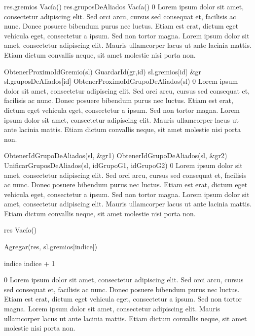 {
	\state res.gremios \asig Vacía()					
	\state res.gruposDeAliados \asig Vacía()			
}
{0}
{Lorem ipsum dolor sit amet, consectetur adipiscing elit. Sed orci arcu, cursus sed consequat et, facilisis ac nunc. Donec posuere bibendum purus nec luctus. Etiam est erat, dictum eget vehicula eget, consectetur a ipsum. Sed non tortor magna. Lorem ipsum dolor sit amet, consectetur adipiscing elit. Mauris ullamcorper lacus ut ante lacinia mattis. Etiam dictum convallis neque, sit amet molestie nisi porta non.}

{
	\state {} \asig ObtenerProximoIdGremio(sl)			
	\state
	\state GuardarId(gr,id)												
	\state sl.gremios[id] \asig \&gr									
	\state sl.gruposDeAliados[id] \asig ObtenerProximoIdGrupoDeAliados(sl)			
}
{0}
{Lorem ipsum dolor sit amet, consectetur adipiscing elit. Sed orci arcu, cursus sed consequat et, facilisis ac nunc. Donec posuere bibendum purus nec luctus. Etiam est erat, dictum eget vehicula eget, consectetur a ipsum. Sed non tortor magna. Lorem ipsum dolor sit amet, consectetur adipiscing elit. Mauris ullamcorper lacus ut ante lacinia mattis. Etiam dictum convallis neque, sit amet molestie nisi porta non.}

{
	\state {} \asig ObtenerIdGrupoDeAliados(sl, \&gr1)			
	\state {} \asig ObtenerIdGrupoDeAliados(sl, \&gr2)			
	\state 
	\state UnificarGruposDeAliados(sl, idGrupoG1, idGrupoG2)							
}
{0}
{Lorem ipsum dolor sit amet, consectetur adipiscing elit. Sed orci arcu, cursus sed consequat et, facilisis ac nunc. Donec posuere bibendum purus nec luctus. Etiam est erat, dictum eget vehicula eget, consectetur a ipsum. Sed non tortor magna. Lorem ipsum dolor sit amet, consectetur adipiscing elit. Mauris ullamcorper lacus ut ante lacinia mattis. Etiam dictum convallis neque, sit amet molestie nisi porta non.}

{
	\state res \asig Vacío()								

	\state
	\state {} 						
					
		\state

		\state Agregar(res, sl.gremios[indice])			

		\state
		\state indice \asig indice + 1						
	\endwhile
}
{0}
{Lorem ipsum dolor sit amet, consectetur adipiscing elit. Sed orci arcu, cursus sed consequat et, facilisis ac nunc. Donec posuere bibendum purus nec luctus. Etiam est erat, dictum eget vehicula eget, consectetur a ipsum. Sed non tortor magna. Lorem ipsum dolor sit amet, consectetur adipiscing elit. Mauris ullamcorper lacus ut ante lacinia mattis. Etiam dictum convallis neque, sit amet molestie nisi porta non.}

